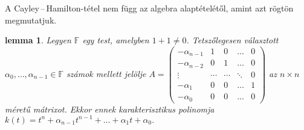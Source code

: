 \documentclass[9pt, a4paper, showtrims]{memoir}
\theoremstyle{plain}
\newtheorem{lemma}[proposition]{lemma}
\theoremstyle{remark}
\theoremstyle{definition}
\begin{document}
A Cayley\,--\,Hamilton-tétel nem függ az algebra alaptételétől, amint azt rögtön megmutatjuk.
\begin{lemma}
	Legyen $\mathbb{F}$ egy test, amelyben $1+1\neq 0$.
	Tetszőlegesen választott $\alpha_0,\ldots,\alpha_{n-1}\in\mathbb{F}$ számok mellett
	jelölje
	\(
	A=
	\begin{pmatrix}
		-\alpha_{n-1} & 1      & 0      & \dots  & 0 \\
		-\alpha_{n-2} & 0      & 1      & \dots  & 0 \\
		\vdots        & \cdots & \cdots & \ddots & 0 \\
		-\alpha_1     & 0      & 0      & \dots  & 1 \\
		-\alpha_0     & 0      & 0      & \dots  & 0
	\end{pmatrix}
	\)
	az $n\times n$ méretű mátrixot.
	Ekkor ennek karakterisztikus polinomja
	\begin{math}
		k\left( t \right)
		=
		t^n+\alpha_{n-1}t^{n-1}+\dots+\alpha_1t+\alpha_0.
	\end{math}
\end{lemma}
\end{document}
